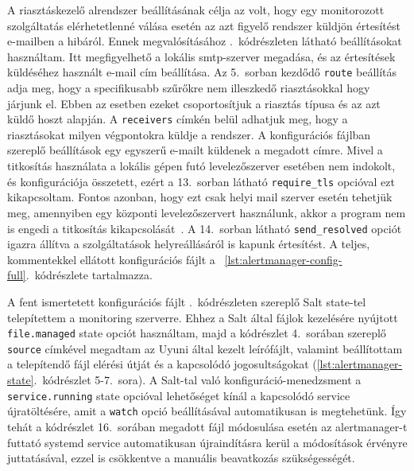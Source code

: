 A riasztáskezelő alrendszer beállításának célja az volt, hogy egy monitorozott szolgáltatás elérhetetlenné válása esetén az azt figyelő rendszer küldjön értesítést e-mailben a hibáról. Ennek megvalósításához .~kódrészleten látható beállításokat használtam. Itt megfigyelhető a lokális \acrshort{smtp}-szerver megadása, és az értesítések küldéséhez használt e-mail cím beállítása.
Az 5.~sorban kezdődő \texttt{route} beállítás adja meg, hogy a specifikusabb szűrőkre nem illeszkedő riasztásokkal hogy járjunk el. Ebben az esetben ezeket csoportosítjuk a riasztás típusa és az azt küldő hoszt alapján. A \texttt{receivers} címkén belül adhatjuk meg, hogy a riasztásokat milyen végpontokra küldje a rendszer. A konfigurációs fájlban szereplő beállítások egy egyszerű e-mailt küldenek a megadott címre. Mivel a titkosítás használata a lokális gépen futó levelezőszerver esetében nem indokolt, és konfigurációja összetett, ezért a 13.~sorban látható \texttt{require\_tls} opcióval ezt kikapcsoltam. Fontos azonban, hogy ezt csak helyi mail szerver esetén tehetjük meg, amennyiben egy központi levelezőszervert használunk, akkor a program nem is engedi a titkosítás kikapcsolását~\cite{PrometheusAlertmanagerConfig}.
A 14.~sorban látható \texttt{send\_resolved} opciót igazra állítva a szolgáltatások helyreállásáról is kapunk értesítést. %
A teljes, kommentekkel ellátott konfigurációs fájlt a ~\ref{lst:alertmanager-config-full}.~kódrészlete tartalmazza.


\begin{figure}[htb]
	
\end{figure}

A fent ismertetett konfigurációs fájlt .~kódrészleten szereplő Salt state-tel telepítettem a monitoring szerverre. Ehhez a Salt által fájlok kezelésére nyújtott \texttt{file.managed} state opciót használtam, majd a kódrészlet 4.~sorában szereplő \texttt{source} címkével megadtam az Uyuni által kezelt leírófájlt, valamint beállítottam a telepítendő fájl elérési útját és a kapcsolódó jogosultságokat (\ref{lst:alertmanager-state}.~kódrészlet 5-7.~sora). 
A Salt-tal való konfiguráció-menedzsment a \texttt{service.running} state opcióval lehetőséget kínál a kapcsolódó service újratöltésére, amit a \texttt{watch} opció beállításával automatikusan is megtehetünk. Így tehát a kódrészlet 16.~sorában megadott fájl módosulása esetén az alertmanager-t futtató systemd service automatikusan újraindításra kerül a módosítások érvényre juttatásával, ezzel is csökkentve a manuális beavatkozás szükségességét.


